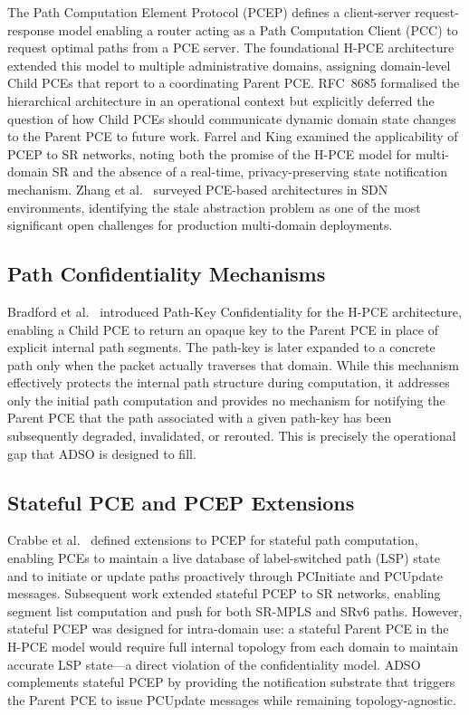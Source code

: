 \documentclass[conference]{IEEEtran}
\begin{document}
The Path Computation Element Protocol (PCEP) \cite{b_rfc5440} defines a
client-server request-response model enabling a router acting as a Path
Computation Client (PCC) to request optimal paths from a PCE server.
The foundational H-PCE architecture \cite{b_aalen} extended this model
to multiple administrative domains, assigning domain-level Child PCEs
that report to a coordinating Parent PCE. RFC~8685 \cite{b_rfc8685}
formalised the hierarchical architecture in an operational context but
explicitly deferred the question of how Child PCEs should communicate
dynamic domain state changes to the Parent PCE to future work. Farrel
and King \cite{b_pce_sr} examined the applicability of PCEP to SR
networks, noting both the promise of the H-PCE model for multi-domain
SR and the absence of a real-time, privacy-preserving state notification
mechanism. Zhang et al.\ \cite{b_pce_survey} surveyed PCE-based
architectures in SDN environments, identifying the stale abstraction
problem as one of the most significant open challenges for production
multi-domain deployments.

\subsection{Path Confidentiality Mechanisms}

Bradford et al.\ \cite{b_rfc5520} introduced Path-Key Confidentiality
for the H-PCE architecture, enabling a Child PCE to return an opaque
key to the Parent PCE in place of explicit internal path segments. The
path-key is later expanded to a concrete path only when the packet
actually traverses that domain. While this mechanism effectively protects
the internal path structure during computation, it addresses only the
initial path computation and provides no mechanism for notifying the
Parent PCE that the path associated with a given path-key has been
subsequently degraded, invalidated, or rerouted. This is precisely the
operational gap that ADSO is designed to fill.

\subsection{Stateful PCE and PCEP Extensions}

Crabbe et al.\ \cite{b_stateful} defined extensions to PCEP for
stateful path computation, enabling PCEs to maintain a live database of
label-switched path (LSP) state and to initiate or update paths
proactively through PCInitiate and PCUpdate messages. Subsequent work
\cite{b_pce_sr} extended stateful PCEP to SR networks, enabling segment
list computation and push for both SR-MPLS and SRv6 paths. However,
stateful PCEP was designed for intra-domain use: a stateful Parent PCE
in the H-PCE model would require full internal topology from each
domain to maintain accurate LSP state---a direct violation of the
confidentiality model. ADSO complements stateful PCEP by providing the
notification substrate that triggers the Parent PCE to issue PCUpdate
messages while remaining topology-agnostic.
\end{document}
